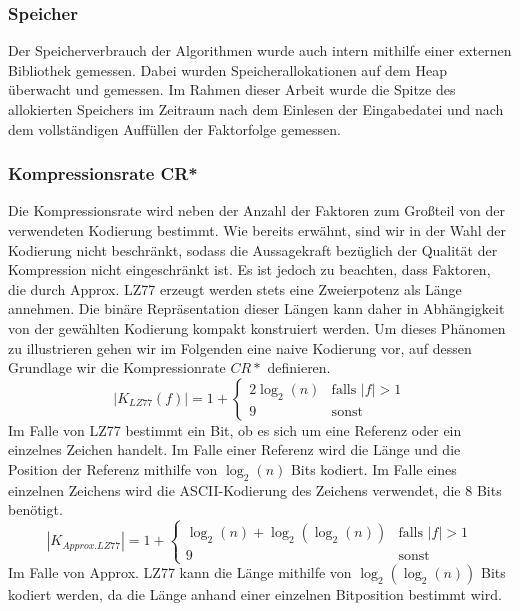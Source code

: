 \subsubsection{Speicher}
Der Speicherverbrauch der Algorithmen wurde auch intern mithilfe einer externen Bibliothek gemessen. Dabei wurden Speicherallokationen auf dem Heap überwacht und 
gemessen. Im Rahmen dieser Arbeit wurde die Spitze des allokierten Speichers im Zeitraum nach dem Einlesen der Eingabedatei und nach dem vollständigen Auffüllen der
Faktorfolge gemessen.

\subsubsection{Kompressionsrate CR*}
Die Kompressionsrate wird neben der Anzahl der Faktoren zum Großteil von der verwendeten Kodierung bestimmt. Wie bereits erwähnt, sind wir in der Wahl der Kodierung
nicht beschränkt, sodass die Aussagekraft bezüglich der Qualität der Kompression nicht eingeschränkt ist. Es ist jedoch zu beachten, dass Faktoren, die durch Approx. LZ77
erzeugt werden stets eine Zweierpotenz als Länge annehmen. Die binäre Repräsentation dieser Längen kann daher in Abhängigkeit von der gewählten Kodierung kompakt 
konstruiert werden. Um dieses Phänomen zu illustrieren gehen wir im Folgenden eine naive Kodierung vor, auf dessen Grundlage wir die Kompressionrate $CR*$ definieren.
\begin{equation}
    |K_{LZ77}(f)| = 1 + \begin{cases}
        2\log_2(n) & \text{falls } |f| > 1 \\
        9 & \text{sonst}
    \end{cases}
\end{equation}
Im Falle von LZ77 bestimmt ein Bit, ob es sich um eine Referenz oder ein einzelnes Zeichen handelt. Im Falle einer Referenz wird die Länge und die Position der Referenz
mithilfe von $\log_2(n)$ Bits kodiert. Im Falle eines einzelnen Zeichens wird die ASCII-Kodierung des Zeichens verwendet, die 8 Bits benötigt.
\begin{equation}
    |K_{Approx.LZ77}|= 1 + \begin{cases}
        \log_2(n)+\log_2(\log_2(n)) & \text{falls } |f| > 1 \\
        9 & \text{sonst}
    \end{cases}
\end{equation}
Im Falle von Approx. LZ77 kann die Länge mithilfe von $\log_2(\log_2(n))$ Bits kodiert werden, da die Länge anhand einer einzelnen Bitposition bestimmt wird.

